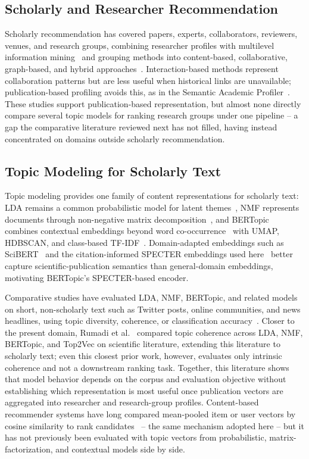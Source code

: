 \subsection{Scholarly and Researcher Recommendation}
Scholarly recommendation has covered papers, experts, collaborators, reviewers, venues, and research groups, combining researcher profiles with multilevel information mining~\cite{yang2014multilevel,sun2015raf} and grouping methods into content-based, collaborative, graph-based, and hybrid approaches~\cite{zhang2023scholarly,bai2019scientific,beel2016research,marcuzzo2022recommendation}. Interaction-based methods represent collaboration patterns but are less useful when historical links are unavailable; publication-based profiling avoids this, as in the Semantic Academic Profiler~\cite{viegas2022semantic}. These studies support publication-based representation, but almost none directly compare several topic models for ranking research groups under one pipeline -- a gap the comparative literature reviewed next has not filled, having instead concentrated on domains outside scholarly recommendation.

\subsection{Topic Modeling for Scholarly Text}
Topic modeling provides one family of content representations for scholarly text: LDA remains a common probabilistic model for latent themes~\cite{jelodar2019lda,blei2003lda}, NMF represents documents through non-negative matrix decomposition~\cite{lee2000nmf}, and BERTopic combines contextual embeddings beyond word co-occurrence~\cite{vaswani2017attention} with UMAP, HDBSCAN, and class-based TF-IDF~\cite{grootendorst2022bertopic}. Domain-adapted embeddings such as SciBERT~\cite{beltagy2019scibert} and the citation-informed SPECTER embeddings used here~\cite{cohan2020specter} better capture scientific-publication semantics than general-domain embeddings, motivating BERTopic's SPECTER-based encoder.

Comparative studies have evaluated LDA, NMF, BERTopic, and related models on short, non-scholarly text such as Twitter posts, online communities, and news headlines, using topic diversity, coherence, or classification accuracy~\cite{egger2022topic,kaur2024moving,babalola2024comprehensive,laureate2023systematic}. Closer to the present domain, Rumadi et al.~\cite{rumadi2025coherence} compared topic coherence across LDA, NMF, BERTopic, and Top2Vec on scientific literature, extending this literature to scholarly text; even this closest prior work, however, evaluates only intrinsic coherence and not a downstream ranking task. Together, this literature shows that model behavior depends on the corpus and evaluation objective without establishing which representation is most useful once publication vectors are aggregated into researcher and research-group profiles. Content-based recommender systems have long compared mean-pooled item or user vectors by cosine similarity to rank candidates~\cite{lops2011content} -- the same mechanism adopted here -- but it has not previously been evaluated with topic vectors from probabilistic, matrix-factorization, and contextual models side by side.

